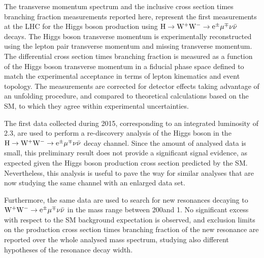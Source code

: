The transverse momentum spectrum and the inclusive cross section times branching fraction measurements reported here, represent the first measurements at the LHC for the Higgs boson production using $\rm{H}\to\rm{W^+W^-}\to e^{\pm} \mu^{\mp}\nu\bar{\nu}$ decays.
The Higgs boson transverse momentum is experimentally reconstructed using the lepton pair transverse momentum and missing transverse momentum. The differential cross section times branching fraction is measured as a function of the Higgs boson transverse momentum in a fiducial phase space defined to match the experimental acceptance in terms of lepton kinematics and event topology. The measurements are corrected for detector effects taking advantage of an unfolding procedure, and compared to theoretical calculations based on the SM, to which they agree within experimental uncertainties.

The first data collected during 2015, corresponding to an integrated luminosity of 2.3\ifb, are used to perform a re-discovery analysis of the Higgs boson in the $\rm{H}\to\rm{W^+W^-}\to e^{\pm} \mu^{\mp}\nu\bar{\nu}$ decay channel. Since the amount of analysed data is small, this preliminary result does not provide a significant signal evidence, as expected given the Higgs boson production cross section predicted by the SM. Nevertheless, this analysis is useful to pave the way for similar analyses that are now studying the same channel with an enlarged data set.

Furthermore, the same data are used to search for new resonances decaying to $\rm{W^+W^-}\to e^{\pm} \mu^{\mp}\nu\bar{\nu}$ in the mass range between 200\GeV and 1\TeV. No significant excess with respect to the SM background expectation is observed, and exclusion limits on the production cross section times branching fraction of the new resonance are reported over the whole analysed mass spectrum, studying also different hypotheses of the resonance decay width.
